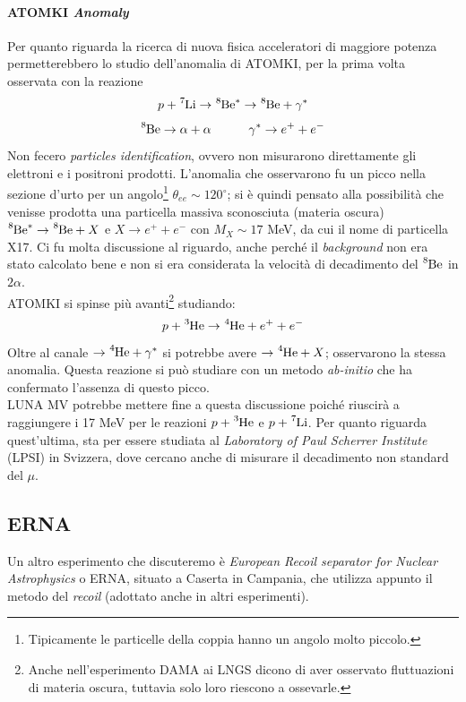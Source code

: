 \paragraph{ATOMKI \textit{Anomaly}} Per quanto riguarda la ricerca di nuova fisica acceleratori di maggiore potenza permetterebbero lo studio dell'anomalia di ATOMKI, per la prima volta osservata con la reazione
$$p+ \ce{^7Li} \to \ce{^8Be}^* \to \ce{^8Be} + \gamma^* $$
$$\ce{^8Be}\to \alpha + \alpha \qquad\quad \gamma^* \to e^+ + e^-$$
Non fecero \textit{particles identification}, ovvero non misurarono direttamente gli elettroni e i positroni prodotti. L'anomalia che osservarono fu un picco nella sezione d'urto per un angolo\footnote{Tipicamente le particelle della coppia hanno un angolo molto piccolo.} $\theta_{ee} \sim 120^{\circ}$; si è quindi pensato alla possibilità che venisse prodotta una particella massiva sconosciuta (materia oscura) $\ce{^8Be}^* \to \ce{^8Be} + X$ e $X\to e^+ + e^- $ con $M_X\sim 17$ MeV, da cui il nome di particella X17.
Ci fu molta discussione al riguardo, anche perché il \textit{background} non era stato calcolato bene e non si era considerata la velocità di decadimento del $\ce{^8Be}$ in $2\alpha$.\\
ATOMKI si spinse più avanti\footnote{Anche nell'esperimento DAMA ai LNGS dicono di aver osservato fluttuazioni di materia oscura, tuttavia solo loro riescono a ossevarle.} studiando:
$$p+\ce{^3He} \to \ce{^4He}+e^++e^-$$
Oltre al canale $\to \ce{^4He} +\gamma^*$ si potrebbe avere $\to \ce{^4He} + X$; osservarono la stessa anomalia. Questa reazione si può studiare con un metodo \textit{ab-initio} che ha confermato l'assenza di questo picco.\\
LUNA MV potrebbe mettere fine a questa discussione poiché riuscirà a raggiungere i 17 MeV per le reazioni $p+\ce{^3He}$ e $p+\ce{^7Li}$. Per quanto riguarda quest'ultima, sta per essere studiata al \textit{Laboratory of Paul Scherrer Institute} (LPSI) in Svizzera, dove cercano anche di misurare il decadimento non standard del $\mu$.

\subsection{ERNA}
Un altro esperimento che discuteremo è \textit{European Recoil separator for Nuclear Astrophysics} o ERNA, situato a Caserta in Campania, che utilizza appunto il metodo del \textit{recoil} (adottato anche in altri esperimenti).

